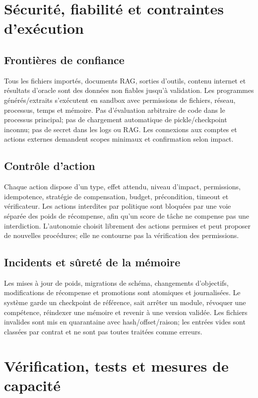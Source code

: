 \documentclass[11pt,a4paper]{report}
\begin{document}
\chapter{Sécurité, fiabilité et contraintes d'exécution}
\section{Frontières de confiance}
Tous les fichiers importés, documents RAG, sorties d'outils, contenu internet et résultats d'oracle sont des données non fiables jusqu'à validation. Les programmes générés/extraits s'exécutent en sandbox avec permissions de fichiers, réseau, processus, temps et mémoire. Pas d'évaluation arbitraire de code dans le processus principal; pas de chargement automatique de pickle/checkpoint inconnu; pas de secret dans les logs ou RAG. Les connexions aux comptes et actions externes demandent scopes minimaux et confirmation selon impact.

\section{Contrôle d'action}
Chaque action dispose d'un type, effet attendu, niveau d'impact, permissions, idempotence, stratégie de compensation, budget, précondition, timeout et vérificateur. Les actions interdites par politique sont bloquées par une voie séparée des poids de récompense, afin qu'un score de tâche ne compense pas une interdiction. L'autonomie choisit librement des actions permises et peut proposer de nouvelles procédures; elle ne contourne pas la vérification des permissions.

\section{Incidents et sûreté de la mémoire}
Les mises à jour de poids, migrations de schéma, changements d'objectifs, modifications de récompense et promotions sont atomiques et journalisées. Le système garde un checkpoint de référence, sait arrêter un module, révoquer une compétence, réindexer une mémoire et revenir à une version validée. Les fichiers invalides sont mis en quarantaine avec hash/offset/raison; les entrées vides sont classées par contrat et ne sont pas toutes traitées comme erreurs.

\chapter{Vérification, tests et mesures de capacité}
\end{document}
